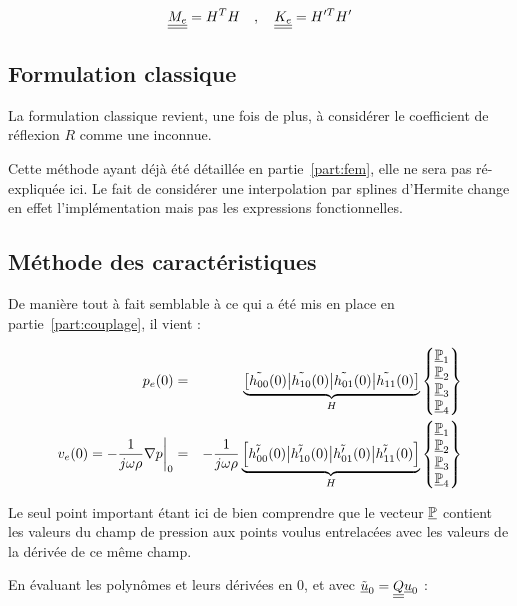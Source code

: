 \begin{equation*}
	\underline{\underline{M_e}} = H^TH \quad,\quad \underline{\underline{K_e}} = H'^TH'
\end{equation*}

\subsection{Formulation classique}

La formulation classique revient, une fois de plus, à considérer le coefficient de réflexion $R$ comme une inconnue.

Cette méthode ayant déjà été détaillée en partie~\ref{part:fem}, elle ne sera pas ré-expliquée ici. Le fait de
considérer une interpolation par splines d'Hermite change en effet l'implémentation mais pas les expressions
fonctionnelles.

\pagebreak

\subsection{Méthode des caractéristiques}

De manière tout à fait semblable à ce qui a été mis en place en partie~\ref{part:couplage}, il vient :

\begin{eqnarray*}
	p_e(0) & = & \underbrace{\left[\tilde{h_{00}}(0)\big|\tilde{h_{10}}(0)\big|\tilde{h_{01}}(0)\big|\tilde{h_{11}}(0)\right]}_{H}\begin{Bmatrix}\underline{\mathbb{P}}_1\\\underline{\mathbb{P}}_2\\\underline{\mathbb{P}}_3\\\underline{\mathbb{P}}_4\end{Bmatrix}\\
	v_e(0) = -\frac{1}{j\omega\rho}\nabla p\bigg|_0& = & -\frac{1}{j\omega\rho}\underbrace{\left[\tilde{h'_{00}}(0)\big|\tilde{h'_{10}}(0)\big|\tilde{h'_{01}}(0)\big|\tilde{h'_{11}}(0)\right]}_{H}\begin{Bmatrix}\underline{\mathbb{P}}_1\\\underline{\mathbb{P}}_2\\\underline{\mathbb{P}}_3\\\underline{\mathbb{P}}_4\end{Bmatrix}
\end{eqnarray*}

Le seul point important étant ici de bien comprendre que le vecteur $\underline{\mathbb{P}}$ contient les valeurs du champ de pression
aux points voulus entrelacées avec les valeurs de la dérivée de ce même champ.

En évaluant les polynômes et leurs dérivées en $0$, et avec $\tilde{\underline{u}}_0 = \underline{\underline{Q}}\underline{u}_0$ :

